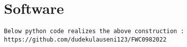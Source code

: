\documentclass[10pt, a4paper]{article}
\begin{document}
\section{Software}
\begin{center}
 \begin{lstlisting}
Below python code realizes the above construction :
https://github.com/dudekulauseni123/FWC0982022
 \end{lstlisting}
\end{center}
\end{document}
